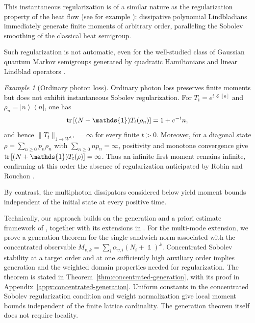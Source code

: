 \documentclass[11pt]{article}
\theoremstyle{myplain}
\theoremstyle{mydefinition}
\theoremstyle{remark}
\newtheorem{ex}{Example}
\DeclareMathOperator{\cL}{\mathcal{L}}
\DeclareMathOperator{\1}{\mathds{1}}
\newcommand{\ketbra}[2]{\left\vert#1\right\rangle\!\! \left\langle#2\right\vert}
\newcommand{\tr}[1][]{\operatorname{tr}%
  \ifx#1\empty \else \left[ #1 \right] \fi}
\begin{document}
    This instantaneous regularization is of a similar nature as the regularization property of the heat flow (see for example \cite{Kato.1995}): dissipative polynomial Lindbladians immediately generate finite moments of arbitrary order, paralleling the Sobolev smoothing of the classical heat semigroup.

    Such regularization is not automatic, even for the well-studied class of Gaussian quantum Markov semigroups generated by quadratic Hamiltonians and linear Lindblad operators \cite{Agredo.2021,Cipriani.2000}.

    \begin{ex}[Ordinary photon loss]\label{ex:photon-loss-no-regularization}
        Ordinary photon loss preserves finite moments but does not exhibit instantaneous Sobolev regularization. For $T_t=e^{t\cL[a]}$ and $\rho_n=\ketbra{n}{n}$, one has
        \begin{equation*}
            \tr[(N+\1)T_t(\rho_n)]=1+e^{-t}n,
        \end{equation*}
        and hence $\|T_t\|_{1\to W^{1,1}}=\infty$ for every finite $t>0$. Moreover, for a diagonal state $\rho=\sum_{n\geq0}p_n\rho_n$ with $\sum_{n\geq0}np_n=\infty$, positivity and monotone convergence give $\tr[(N+\1)T_t(\rho)]=\infty$. Thus an infinite first moment remains infinite, confirming at this order the absence of regularization anticipated by Robin and Rouchon \cite[Sec.~4]{Robin.2025Galerkin}.
    \end{ex}

    By contrast, the multiphoton dissipators considered below yield moment bounds independent of the initial state at every positive time.

    Technically, our approach builds on the generation and a priori estimate framework of \cite{Gondolf.2024}, together with its extensions in \cite{Moebus.2025thesis}. For the multi-mode extension, we prove a generation theorem for the single-sandwich norm associated with the concentrated observable $M_{v,k}=\sum_i\alpha_{v,i}(N_i+\1)^k$. Concentrated Sobolev stability at a target order and at one sufficiently high auxiliary order implies generation and the weighted domain properties needed for regularization. The theorem is stated in Theorem~\ref{thm:concentrated-generation}, with its proof in Appendix~\ref{appx:concentrated-generation}. Uniform constants in the concentrated Sobolev regularization condition and weight normalization give local moment bounds independent of the finite lattice cardinality. The generation theorem itself does not require locality.
\end{document}
